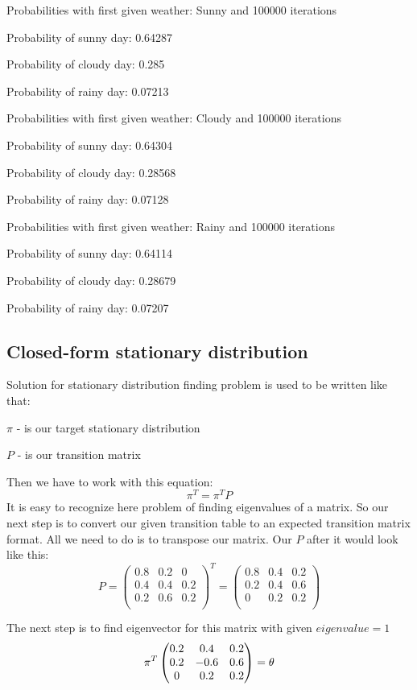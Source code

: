 \documentclass{article}
\begin{document}
\text{}

Probabilities with first given weather: Sunny and 100000 iterations

Probability of sunny day: 0.64287

Probability of cloudy day: 0.285

Probability of rainy day: 0.07213

\text{}

Probabilities with first given weather: Cloudy and 100000 iterations

Probability of sunny day: 0.64304

Probability of cloudy day: 0.28568

Probability of rainy day: 0.07128

\text{}

Probabilities with first given weather: Rainy and 100000 iterations

Probability of sunny day: 0.64114

Probability of cloudy day: 0.28679

Probability of rainy day: 0.07207

\subsection{Closed-form stationary distribution}
Solution for stationary distribution finding problem is used to be written like that:

$\pi$ - is our target stationary distribution

$P$ - is our transition matrix

Then we have to work with this equation:
$$\pi^T = \pi^TP$$
It is easy to recognize here problem of finding eigenvalues of a matrix.
So our next step is to convert our given transition table to an expected transition matrix format. All we need to do is to transpose our matrix.
Our $P$ after it would look like this:
$$P=\begin{pmatrix}0.8 & 0.2 & 0 \\
0.4 & 0.4 & 0.2 \\
0.2 & 0.6 & 0.2 \\
\end{pmatrix}^T = \begin{pmatrix}0.8 & 0.4 & 0.2 \\
0.2 & 0.4 & 0.6 \\
0 & 0.2 & 0.2 \\
\end{pmatrix}$$

The next step is to find eigenvector for this matrix with given $eigenvalue = 1$
$$\pi^T\begin{pmatrix}\-0.2 & 0.4 & 0.2 \\
0.2 & -0.6 & 0.6 \\
0 & 0.2 & 0.2 \end{pmatrix} = \theta $$
\end{document}
